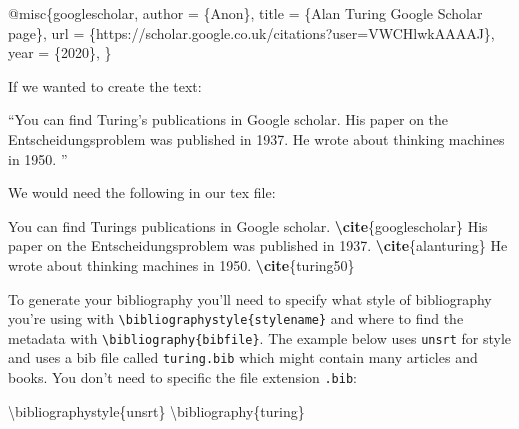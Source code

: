 \documentclass[
]{book}
\newenvironment{Shaded}{\begin{snugshade}}{\end{snugshade}}
\newcommand{\BuiltInTok}[1]{#1}
\newcommand{\ExtensionTok}[1]{#1}
\newcommand{\KeywordTok}[1]{\textcolor[rgb]{0.13,0.29,0.53}{\textbf{#1}}}
\newcommand{\NormalTok}[1]{#1}
\begin{document}
\begin{Shaded}
\begin{Highlighting}[]
\NormalTok{@misc\{googlescholar,}
\NormalTok{  author       = \{Anon\},}
\NormalTok{  title        = \{Alan Turing Google Scholar page\},}
\NormalTok{  url          = \{https://scholar.google.co.uk/citations?user=VWCHlwkAAAAJ\},}
\NormalTok{  year         = \{2020\},}
\NormalTok{\}}
\end{Highlighting}
\end{Shaded}

If we wanted to create the text:

``You can find Turing's publications in Google scholar. \citep{googlescholar}
His paper on the Entscheidungsproblem was published in 1937. \citep{turing}
He wrote about thinking machines in 1950. \citep{turing50}''

We would need the following in our tex file:

\begin{Shaded}
\begin{Highlighting}[]
\NormalTok{You can find Turing\textquotesingle{}s publications in Google scholar. }\KeywordTok{\textbackslash{}cite}\NormalTok{\{}\ExtensionTok{googlescholar}\NormalTok{\}}
\NormalTok{His paper on the Entscheidungsproblem was published in 1937. }\KeywordTok{\textbackslash{}cite}\NormalTok{\{}\ExtensionTok{alanturing}\NormalTok{\}}
\NormalTok{He wrote about thinking machines in 1950. }\KeywordTok{\textbackslash{}cite}\NormalTok{\{}\ExtensionTok{turing50}\NormalTok{\}}
\end{Highlighting}
\end{Shaded}

To generate your bibliography you'll need to specify what style of bibliography you're using with \texttt{\textbackslash{}bibliographystyle\{stylename\}} and where to find the metadata with \texttt{\textbackslash{}bibliography\{bibfile\}}. The example below uses \texttt{unsrt} for style and uses a bib file called \texttt{turing.bib} which might contain many articles and books. You don't need to specific the file extension \texttt{.bib}:

\begin{Shaded}
\begin{Highlighting}[]
\BuiltInTok{\textbackslash{}bibliographystyle}\NormalTok{\{}\ExtensionTok{unsrt}\NormalTok{\}}
\BuiltInTok{\textbackslash{}bibliography}\NormalTok{\{}\ExtensionTok{turing}\NormalTok{\}}
\end{Highlighting}
\end{Shaded}
\end{document}
